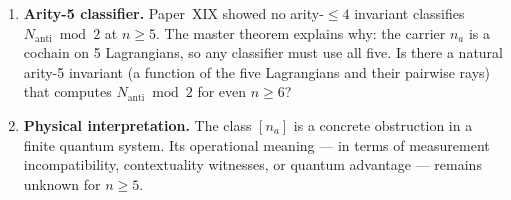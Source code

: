 \documentclass[11pt,a4paper]{article}
\newcommand{\Nanti}{N_{\mathrm{anti}}}
\theoremstyle{plain}
\theoremstyle{definition}
\theoremstyle{remark}
\begin{document}
\begin{enumerate}
\item \textbf{Arity-5 classifier.}
  Paper~XIX showed no arity-$\leq 4$ invariant classifies
  $\Nanti \bmod 2$ at $n \geq 5$.
  The master theorem explains why: the carrier $n_a$ is a
  cochain on 5 Lagrangians, so any classifier must use all five.
  Is there a natural arity-5 invariant (a function of the five
  Lagrangians and their pairwise rays) that computes
  $\Nanti \bmod 2$ for even $n \geq 6$?

\item \textbf{Physical interpretation.}
  The class $[n_a]$ is a concrete obstruction in a finite quantum system.
  Its operational meaning — in terms of measurement incompatibility,
  contextuality witnesses, or quantum advantage — remains unknown
  for $n \geq 5$.
\end{enumerate}
\end{document}
